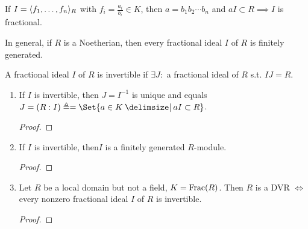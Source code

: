\begin{example}
  If $I = \langle f_1, \dots, f_n\rangle_R$ with $f_i = \frac{a_i}{b_i} \in K$, then
  $a = b_1b_2 \dotsm b_n$ and $aI \subset R \implies I$ is fractional.

  In general, if $R$ is a Noetherian, then every fractional ideal $I$ of $R$
  is finitely generated.
\end{example}

\begin{definition}
  A fractional ideal $I$ of $R$ is invertible if $\exists J:$ a fractional ideal
  of $R$ s.t. $IJ = R$.
\end{definition}

\begin{prop}\mbox{}
  \begin{enumerate}
    \item If $I$ is invertible, then $J = I^{-1}$ is unique and equals
      $J = (R:I) \triangleq = \Set{a \in K \given aI \subset R}$.
      \begin{proof}
      \end{proof}
    \item If $I$ is invertible, then$I$ is a finitely generated $R$-module.
      \begin{proof}
      \end{proof}
    \item Let $R$ be a local domain but not a field, $K = \operatorname{Frac}(R)$.
      Then $R$ is a DVR $\iff$ every nonzero fractional ideal $I$ of $R$ is
      invertible.
      \begin{proof}
      \end{proof}
  \end{enumerate}
\end{prop}

